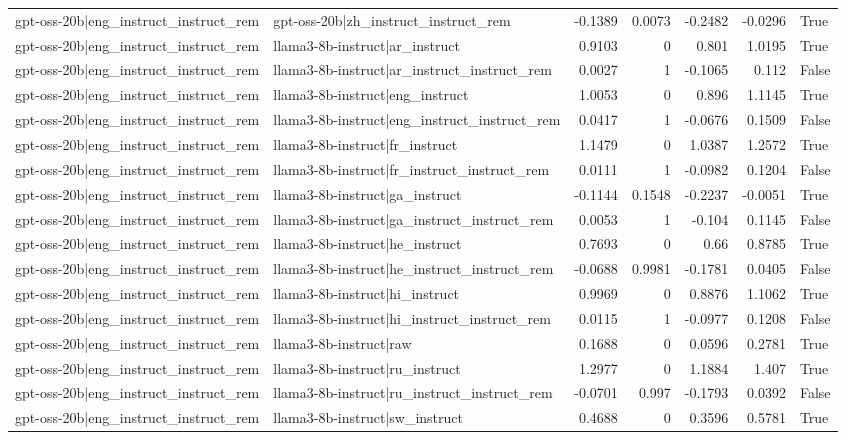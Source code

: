 \begin{table}
\begin{tabular}{l l r r r r l}
gpt-oss-20b|eng_instruct_instruct_rem & gpt-oss-20b|zh_instruct_instruct_rem & -0.1389 & 0.0073 & -0.2482 & -0.0296 & True \\
gpt-oss-20b|eng_instruct_instruct_rem & llama3-8b-instruct|ar_instruct & 0.9103 & 0 & 0.801 & 1.0195 & True \\
gpt-oss-20b|eng_instruct_instruct_rem & llama3-8b-instruct|ar_instruct_instruct_rem & 0.0027 & 1 & -0.1065 & 0.112 & False \\
gpt-oss-20b|eng_instruct_instruct_rem & llama3-8b-instruct|eng_instruct & 1.0053 & 0 & 0.896 & 1.1145 & True \\
gpt-oss-20b|eng_instruct_instruct_rem & llama3-8b-instruct|eng_instruct_instruct_rem & 0.0417 & 1 & -0.0676 & 0.1509 & False \\
gpt-oss-20b|eng_instruct_instruct_rem & llama3-8b-instruct|fr_instruct & 1.1479 & 0 & 1.0387 & 1.2572 & True \\
gpt-oss-20b|eng_instruct_instruct_rem & llama3-8b-instruct|fr_instruct_instruct_rem & 0.0111 & 1 & -0.0982 & 0.1204 & False \\
gpt-oss-20b|eng_instruct_instruct_rem & llama3-8b-instruct|ga_instruct & -0.1144 & 0.1548 & -0.2237 & -0.0051 & True \\
gpt-oss-20b|eng_instruct_instruct_rem & llama3-8b-instruct|ga_instruct_instruct_rem & 0.0053 & 1 & -0.104 & 0.1145 & False \\
gpt-oss-20b|eng_instruct_instruct_rem & llama3-8b-instruct|he_instruct & 0.7693 & 0 & 0.66 & 0.8785 & True \\
gpt-oss-20b|eng_instruct_instruct_rem & llama3-8b-instruct|he_instruct_instruct_rem & -0.0688 & 0.9981 & -0.1781 & 0.0405 & False \\
gpt-oss-20b|eng_instruct_instruct_rem & llama3-8b-instruct|hi_instruct & 0.9969 & 0 & 0.8876 & 1.1062 & True \\
gpt-oss-20b|eng_instruct_instruct_rem & llama3-8b-instruct|hi_instruct_instruct_rem & 0.0115 & 1 & -0.0977 & 0.1208 & False \\
gpt-oss-20b|eng_instruct_instruct_rem & llama3-8b-instruct|raw & 0.1688 & 0 & 0.0596 & 0.2781 & True \\
gpt-oss-20b|eng_instruct_instruct_rem & llama3-8b-instruct|ru_instruct & 1.2977 & 0 & 1.1884 & 1.407 & True \\
gpt-oss-20b|eng_instruct_instruct_rem & llama3-8b-instruct|ru_instruct_instruct_rem & -0.0701 & 0.997 & -0.1793 & 0.0392 & False \\
gpt-oss-20b|eng_instruct_instruct_rem & llama3-8b-instruct|sw_instruct & 0.4688 & 0 & 0.3596 & 0.5781 & True \\

\end{tabular}
\end{table}
